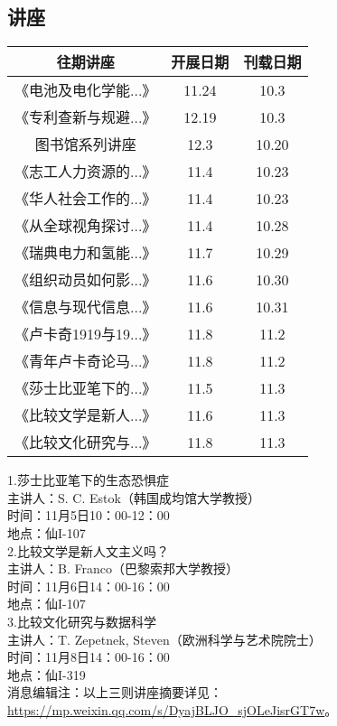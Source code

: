 \documentclass[letterpaper, 12pt]{article}
\begin{document}
\begin{multicols}{2}

\section{讲座}
\begin{tabular}{|c|c|c|}
    \hline
    往期讲座 & 开展日期 & 刊载日期\\
    \hline\hline
    《电池及电化学能...》 & 11.24 & 10.3\\
    《专利查新与规避...》 & 12.19 & 10.3\\
    图书馆系列讲座 & 12.3 & 10.20\\
    《志工人力资源的...》 & 11.4 & 10.23\\
    《华人社会工作的...》 & 11.4 & 10.23\\
    《从全球视角探讨...》 & 11.4 & 10.28\\
    《瑞典电力和氢能...》 & 11.7 & 10.29\\
    《组织动员如何影...》 & 11.6 & 10.30\\
    《信息与现代信息...》 & 11.6 & 10.31\\
    《卢卡奇1919与19...》 & 11.8 & 11.2\\
    《青年卢卡奇论马...》 & 11.8 & 11.2\\
    《莎士比亚笔下的...》 & 11.5 & 11.3\\
    《比较文学是新人...》 & 11.6 & 11.3\\
    《比较文化研究与...》 & 11.8 & 11.3\\
    \hline
\end{tabular}

1.莎士比亚笔下的生态恐惧症\\
主讲人：S. C. Estok（韩国成均馆大学教授）\\
时间：11月5日10：00-12：00\\
地点：仙I-107\\

2.比较文学是新人文主义吗？\\
主讲人：B. Franco（巴黎索邦大学教授）\\
时间：11月6日14：00-16：00\\
地点：仙I-107\\

3.比较文化研究与数据科学\\
主讲人：T. Zepetnek, Steven（欧洲科学与艺术院院士）\\
时间：11月8日14：00-16：00\\
地点：仙I-319\\
消息编辑注：以上三则讲座摘要详见：\url{https://mp.weixin.qq.com/s/DyajBLJO_sjOLeJisrGT7w}。\\


\end{multicols}
\end{document}
